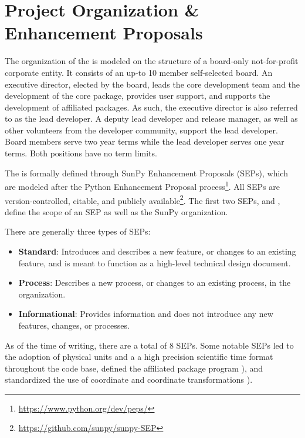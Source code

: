 \section{Project Organization \& Enhancement Proposals}
\label{sec:proj_org}

The organization of the \sunpyproj is modeled on the structure of a board-only not-for-profit corporate entity.
It consists of an up-to 10 member self-selected board.
An executive director, elected by the board, leads the core development team and the development of the \sunpypkg core package, provides user support, and supports the development of affiliated packages.
As such, the executive director is also referred to as the lead developer.
A deputy lead developer and release manager, as well as other volunteers from the developer community, support the lead developer.
Board members serve two year terms while the lead developer serves one year terms. Both positions have no term limits.

The \sunpyproj is formally defined through SunPy Enhancement Proposals (SEPs), which are modeled after the Python Enhancement Proposal process\footnote{\url{https://www.python.org/dev/peps/}}.
All SEPs are version-controlled, citable, and publicly available\footnote{\url{https://github.com/sunpy/sunpy-SEP}}.
The first two SEPs, \citet[SEP-0001]{sep-0001} and \citet[SEP-0002]{sep-0002}, define the scope of an SEP as well as the SunPy organization.

There are generally three types of SEPs:
\begin{itemize}
    \item \textbf{Standard}: Introduces and describes a new feature, or changes to an existing feature, and is meant to function as a high-level technical design document.
    \item \textbf{Process}: Describes a new process, or changes to an existing process, in the organization.
    \item \textbf{Informational}: Provides information and does not introduce any new features, changes, or processes.
\end{itemize}

As of the time of writing, there are a total of 8 SEPs.
Some notable SEPs led to the adoption of physical units \citep[SEP-0003][see Section~\ref{sec:units}]{sep-0003} and a a high precision scientific time format \citep[SEP-0008][see Section~\ref{sec:units}]{sep-0008} throughout the code base, defined the affiliated package program \citep[SEP-0004][see Section~\ref{sec:affil_package}]{sep-0004}), and standardized the use of coordinate and coordinate transformations \citep[SEP-0005][see Section~\ref{sec:coords}]{sep-0005}).
